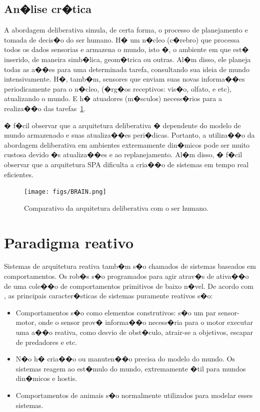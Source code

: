 \subsection{An�lise cr�tica}
A abordagem deliberativa simula, de certa forma, o processo de planejamento e
tomada de decis�o do ser humano. H� um n�cleo (c�rebro) que
processa todos os dados sensorias e armazena o mundo, isto �, o ambiente em que
est� inserido, de maneira simb�lica, geom�trica ou outras.
Al�m disso, ele planeja todas as a��es para uma determinada tarefa, consultando sua ideia de mundo intensivamente. H�,
tamb�m, sensores que enviam suas novas informa��es periodicamente para o n�cleo,
(�rg�os receptivos: vis�o, olfato, e etc), atualizando o mundo. E h�
atuadores (m�sculos) necess�rios para a realiza��o das tarefas~\ref{brain}.

� f�cil observar que a arquitetura deliberativa � dependente do
modelo de mundo armazenado e suas atualiza��es peri�dicas. Portanto, a
utiliza��o da abordagem deliberativa em ambientes extremamente din�micos pode ser muito
custosa devido �s atualiza��es e ao replanejamento. Al�m disso, � f�cil observar
que a arquitetura SPA dificulta a cria��o de sistemas em tempo real eficientes.

\begin{figure}[H]
\centering
\texttt{[image: figs/BRAIN.png]}
\caption{Comparativo da arquitetura deliberativa com o ser humano.}
\label{brain}
\end{figure}

\section{Paradigma reativo}

Sistemas de arquitetura reativa tamb�m s�o chamados de sistemas baseados em
comportamentos. Os rob�s s�o programados para agir atrav�s de ativa��o de uma
cole��o de comportamentos primitivos de baixo n�vel. De acordo com
\cite{arkin1995reactive}, as principais caracter�sticas de sistemas puramente
reativos s�o:

\begin{itemize}
  \item Comportamentos s�o como elementos construtivos: s�o um par sensor-motor,
  onde o sensor prov� informa��o necess�ria para o motor executar uma a��o
  reativa, como desvio de obst�culo, atrair-se a objetivos, escapar de
  predadores e etc.
  \item N�o h� cria��o ou manuten��o precisa do modelo do mundo. Os sistemas
  reagem ao est�mulo do mundo, extremamente �til para mundos din�micos e
  hostis.
  \item Comportamentos de animais s�o normalmente utilizados para modelar esses
  sistemas.
\end{itemize}

